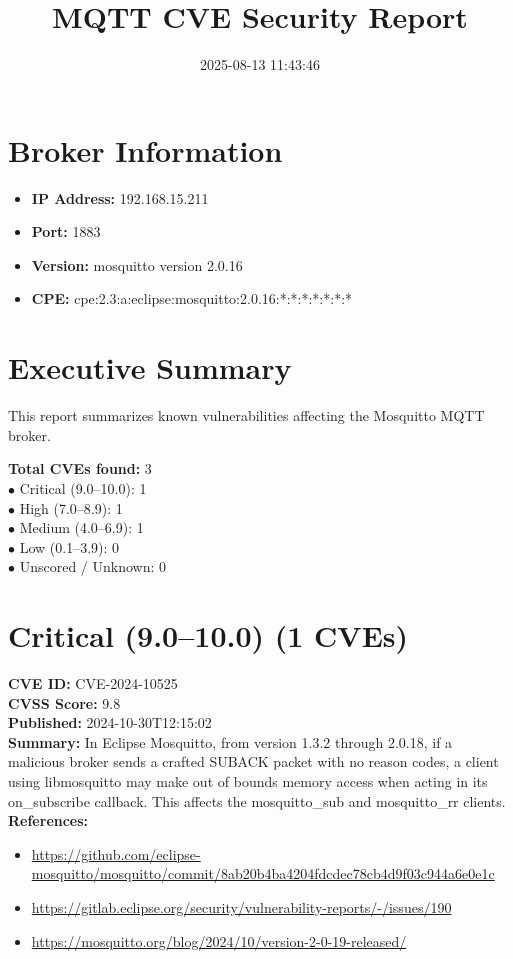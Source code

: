 \documentclass{article}
\title{MQTT CVE Security Report}
\date{2025-08-13 11:43:46}
\begin{document}
\maketitle

\section*{Broker Information}
\begin{itemize}
  \item \textbf{IP Address:} 192.168.15.211
  \item \textbf{Port:} 1883
  \item \textbf{Version:} mosquitto version 2.0.16
  \item \textbf{CPE:} cpe:2.3:a:eclipse:mosquitto:2.0.16:*:*:*:*:*:*:*
\end{itemize}

\section*{Executive Summary}
This report summarizes known vulnerabilities affecting the Mosquitto MQTT broker.

\textbf{Total CVEs found:} 3\\
\quad $\bullet$ Critical (9.0–10.0): 1\\
\quad $\bullet$ High (7.0–8.9): 1\\
\quad $\bullet$ Medium (4.0–6.9): 1\\
\quad $\bullet$ Low (0.1–3.9): 0\\
\quad $\bullet$ Unscored / Unknown: 0\\

\section*{Critical (9.0–10.0) (1 CVEs)}
\textbf{CVE ID:} CVE-2024-10525\\
\textbf{CVSS Score:} 9.8\\
\textbf{Published:} 2024-10-30T12:15:02\\
\textbf{Summary:} In Eclipse Mosquitto, from version 1.3.2 through 2.0.18, if a malicious broker sends a crafted SUBACK packet with no reason codes, a client using libmosquitto may make out of bounds memory access when acting in its on\_subscribe callback. This affects the mosquitto\_sub and mosquitto\_rr clients.\\
\textbf{References:}\\\begin{itemize}
\item \href{https://github.com/eclipse-mosquitto/mosquitto/commit/8ab20b4ba4204fdcdec78cb4d9f03c944a6e0e1c}{https://github.com/eclipse-mosquitto/mosquitto/commit/8ab20b4ba4204fdcdec78cb4d9f03c944a6e0e1c}
\item \href{https://gitlab.eclipse.org/security/vulnerability-reports/-/issues/190}{https://gitlab.eclipse.org/security/vulnerability-reports/-/issues/190}
\item \href{https://mosquitto.org/blog/2024/10/version-2-0-19-released/}{https://mosquitto.org/blog/2024/10/version-2-0-19-released/}
\end{itemize}
\vspace{0.5cm}
\end{document}
